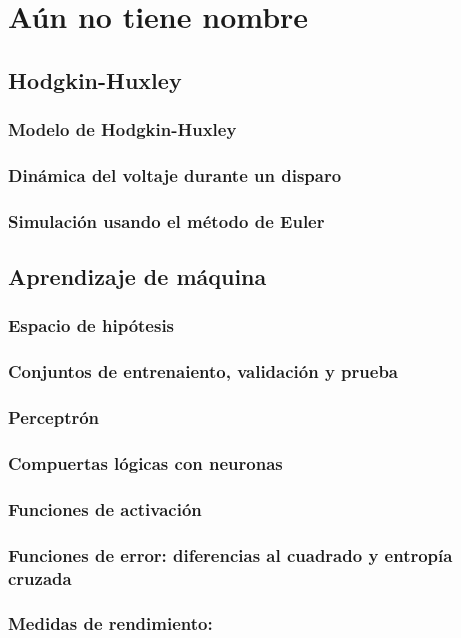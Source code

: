 \documentclass[12pt,openany]{book}
\begin{document}
\part{Aún no tiene nombre}
\chapter{Hodgkin-Huxley}
\section{Modelo de Hodgkin-Huxley}
\section{Dinámica del voltaje durante un disparo}
\section{Simulación usando el método de Euler}



\chapter{Aprendizaje de máquina}
\section{Espacio de hipótesis}
\section{Conjuntos de entrenaiento, validación y prueba}
\section{Perceptrón}
\section{Compuertas lógicas con neuronas}
\section{Funciones de activación}
\section{Funciones de error: diferencias al cuadrado y entropía cruzada}
\section{Medidas de rendimiento:}
\end{document}
